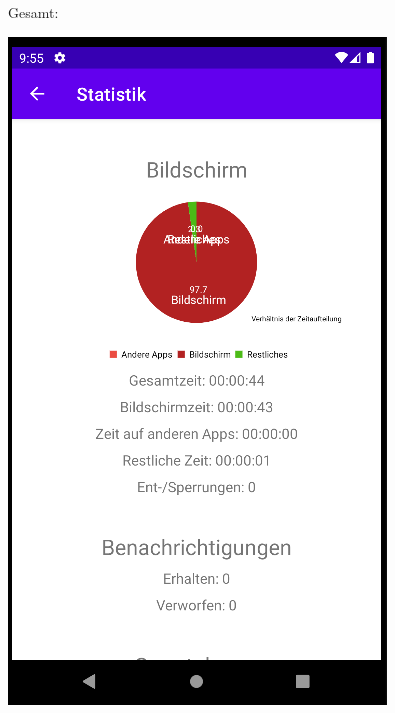 \documentclass[ngerman]{tutorial}
\begin{document}
\begin{center}
\end{center}

\centering Gesamt:\nobreak
\begin{center}
    \includegraphics[scale=0.45]{stats_complete_1.png}\quad

\end{center}
\end{document}

